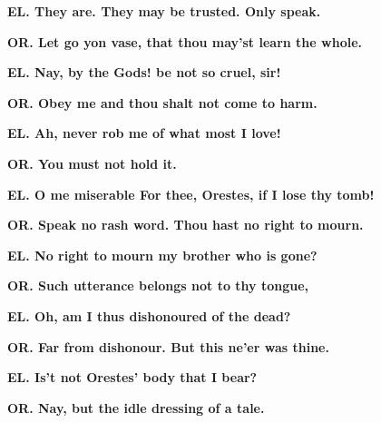 \documentclass[11pt,letter]{book}
\begin{document}
\par \textbf{EL. They are. They may be trusted. Only speak.}
\par 

\par \textbf{OR. Let go yon vase, that thou may’st learn the whole.}
\par 

\par \textbf{EL. Nay, by the Gods! be not so cruel, sir!}
\par 

\par \textbf{OR. Obey me and thou shalt not come to harm.}
\par 

\par \textbf{EL. Ah, never rob me of what most I love!}
\par 

\par \textbf{OR. You must not hold it.}
\par 

\par \textbf{EL. O me miserable For thee, Orestes, if I lose thy tomb!}
\par 

\par \textbf{OR. Speak no rash word. Thou hast no right to mourn.}
\par 

\par \textbf{EL. No right to mourn my brother who is gone?}
\par 

\par \textbf{OR. Such utterance belongs not to thy tongue,}
\par 

\par \textbf{EL. Oh, am I thus dishonoured of the dead?}
\par 

\par \textbf{OR. Far from dishonour. But this ne’er was thine.}
\par 

\par \textbf{EL. Is’t not Orestes’ body that I bear?}
\par 

\par \textbf{OR. Nay, but the idle dressing of a tale.}
\par 
\end{document}
